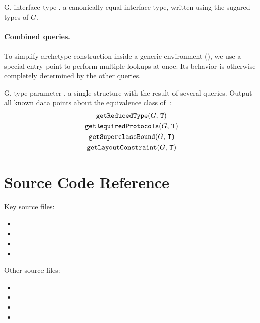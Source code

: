 \documentclass[../generics]{subfiles}
\begin{document}
\begin{itemize}
{G, \tT}
{interface type \tT.}
{a canonically equal interface type, written using the sugared types of $G$.}
{}
\end{itemize}

\paragraph{Combined queries.} To simplify archetype construction inside a generic environment (), we use a special entry point to perform multiple lookups at once. Its behavior is otherwise completely determined by the other queries.

\begin{itemize}
{G, \tT}
{type parameter \tT.}
{a single structure with the result of several queries.}
{Output all known data points about the equivalence class of~\tT:
\begin{gather*}
\texttt{getReducedType}(G,\,\texttt{T})\\
\texttt{getRequiredProtocols}(G,\,\texttt{T})\\
\texttt{getSuperclassBound}(G,\,\texttt{T})\\
\texttt{getLayoutConstraint}(G,\,\texttt{T})
\end{gather*}}
\end{itemize}

\section{Source Code Reference}\label{genericsigsourceref}

Key source files:
\begin{itemize}
\item {}
\item {}
\item {}
\item {}
\end{itemize}
Other source files:
\begin{itemize}
\item {}
\item {}
\item {}
\item {}
\end{itemize}
\end{document}
